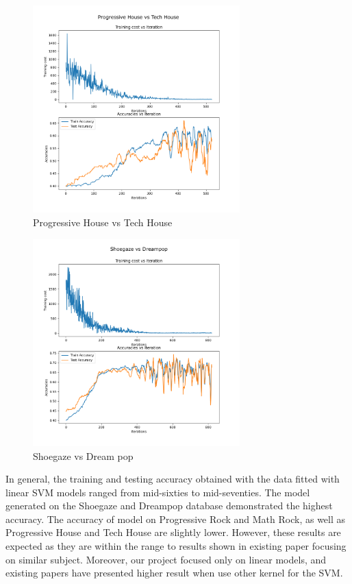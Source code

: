 \documentclass[letterpaper, 12 pt, conference]{ieeeconf}  %
\begin{document}
\begin{figure}
\includegraphics[width=8cm]{phth_svm.png}
\caption{Progressive House vs Tech House}
\end{figure}
\begin{figure}
\includegraphics[width=8cm]{sgdp_svm.png}
\caption{Shoegaze vs Dream pop}
\end{figure}

\par In general, the training and testing accuracy obtained with the data fitted with linear SVM models ranged from mid-sixties to mid-seventies. The model generated on the Shoegaze and Dreampop database demonstrated the highest accuracy. The accuracy of model on Progressive Rock and Math Rock, as well as Progressive House and Tech House are slightly lower. However, these results are expected as they are within the range to results shown in existing paper focusing on similar subject. Moreover, our project focused only on linear models, and existing papers have presented higher result when use other kernel for the SVM. 
\newline \,\,
\end{document}

